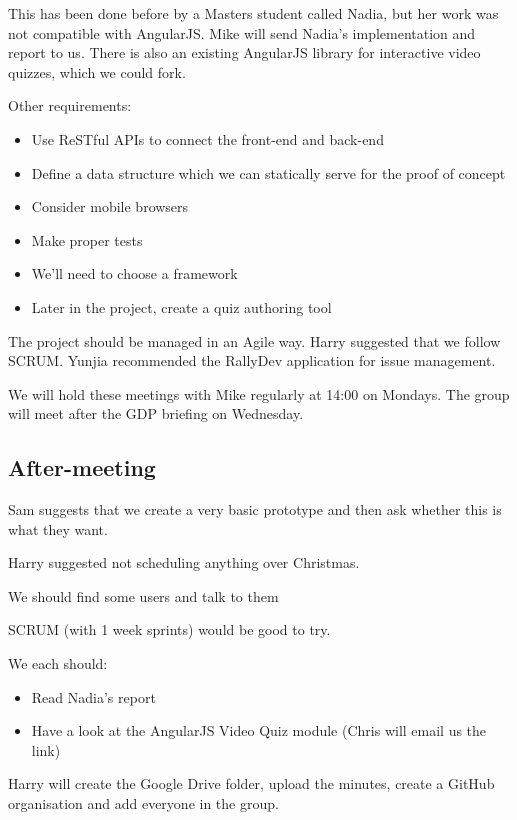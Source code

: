 This has been done before by a Masters student called Nadia, but her
work was not compatible with AngularJS. Mike will send Nadia's
implementation and report to us. There is also an existing AngularJS
library for interactive video quizzes, which we could fork.

Other requirements:

\begin{itemize}
\itemsep1pt\parskip0pt
\item
  Use ReSTful APIs to connect the front-end and back-end
\item
  Define a data structure which we can statically serve for the proof of
  concept
\item
  Consider mobile browsers
\item
  Make proper tests
\item
  We'll need to choose a framework
\item
  Later in the project, create a quiz authoring tool
\end{itemize}

The project should be managed in an Agile way. Harry suggested that we
follow SCRUM. Yunjia recommended the RallyDev application for issue
management.

We will hold these meetings with Mike regularly at 14:00 on Mondays. The
group will meet after the GDP briefing on Wednesday.

\subsection{After-meeting}

Sam suggests that we create a very basic prototype and then ask whether
this is what they want.

Harry suggested not scheduling anything over Christmas.

We should find some users and talk to them

SCRUM (with 1 week sprints) would be good to try.

We each should:

\begin{itemize}
\itemsep1pt\parskip0pt
\item
  Read Nadia's report
\item
  Have a look at the AngularJS Video Quiz module (Chris will email us the link)
\end{itemize}

Harry will create the Google Drive folder, upload the minutes, create a
GitHub organisation and add everyone in the group.


